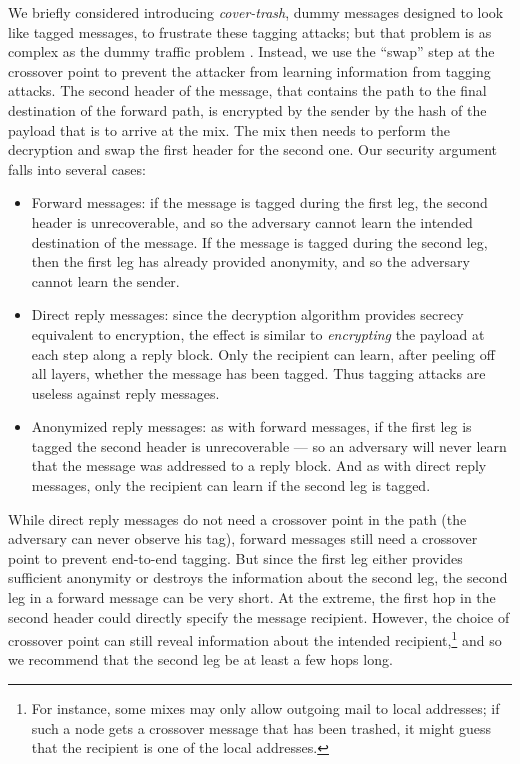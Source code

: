 \documentclass[11pt]{IEEEtran}
\begin{document}
We briefly considered introducing \emph{cover-trash}, dummy messages
designed to look like tagged messages, to frustrate
these tagging attacks; but that problem is as complex as the dummy
traffic problem \cite{langos02}. Instead, we use the
``swap'' step at the
crossover point to prevent the attacker from learning information from
tagging attacks. The second header of the message, that contains the
path to the final destination of the forward path,  is encrypted by the
sender by the hash of the payload that is to arrive at the mix. The
mix then needs to perform the decryption and swap the first header for
the second one.
Our security argument falls into several cases:

\begin{itemize}
\item Forward messages: if the message is tagged during the first leg,
the second header is unrecoverable, and so the adversary cannot
learn the intended destination of the message. If the message is tagged
during the second leg, then the first leg has already provided anonymity,
and so the adversary cannot learn the sender.
\item Direct reply messages: since the decryption algorithm provides
secrecy equivalent to encryption, the effect is similar to {\em encrypting}
the payload at each step along a reply block. Only the recipient can learn,
after peeling off all layers, whether the message has been tagged. Thus
tagging attacks are useless against reply messages.
\item Anonymized reply messages: as with forward messages, if the first leg
is tagged the second header is unrecoverable --- so an adversary will
never learn that the message was addressed to a reply block. And as with
direct reply messages, only the recipient can learn if the second leg is
tagged.
\end{itemize}

While direct reply messages do not need a crossover point in the path
(the adversary can never observe his tag), forward messages still need a
crossover point to prevent end-to-end tagging. But since the first leg
either provides sufficient anonymity or destroys the information about
the second leg, the second leg in a forward message can be very short.
At the extreme, the first hop in the second header could directly
specify the message recipient. However, the choice of crossover point
can still reveal information about the intended recipient,\footnote{For instance,
some mixes may only allow outgoing mail to local addresses; if such a
node gets a crossover message that has been trashed, it might guess
that the recipient is one of the local addresses.} and so we recommend
that the second leg be at least a few hops long.
\end{document}
